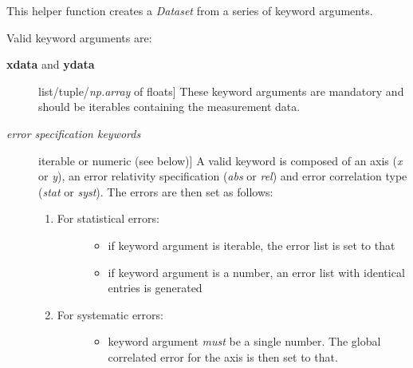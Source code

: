 \documentclass[a4paper,10pt,english]{sphinxmanual}
\begin{document}
\begin{fulllineitems}
\label{index:kafe.dataset.build_dataset}
This helper function creates a \emph{Dataset} from a series of keyword arguments.

Valid keyword arguments are:
\begin{description}
\item[{\textbf{xdata} and \textbf{ydata}}] \leavevmode{[}list/tuple/\emph{np.array} of floats{]}
These keyword arguments are mandatory and should be iterables containing the measurement data.

\item[{\emph{error specification keywords}}] \leavevmode{[}iterable or numeric (see below){]}
A valid keyword is composed of an axis (\emph{x} or \emph{y}), an error relativity specification (\emph{abs} or \emph{rel})
and error correlation type (\emph{stat} or \emph{syst}). The errors are then set as follows:
\begin{enumerate}
\item {} \begin{description}
\item[{For statistical errors:}] \leavevmode\begin{itemize}
\item {} 
if keyword argument is iterable, the error list is set to that

\item {} 
if keyword argument is a number, an error list with identical entries is generated

\end{itemize}

\end{description}

\item {} \begin{description}
\item[{For systematic errors:}] \leavevmode\begin{itemize}
\item {} 
keyword argument \emph{must} be a single number. The global correlated error for the axis is then set to that.

\end{itemize}

\end{description}

\end{enumerate}


\end{description}
\end{fulllineitems}
\end{document}
